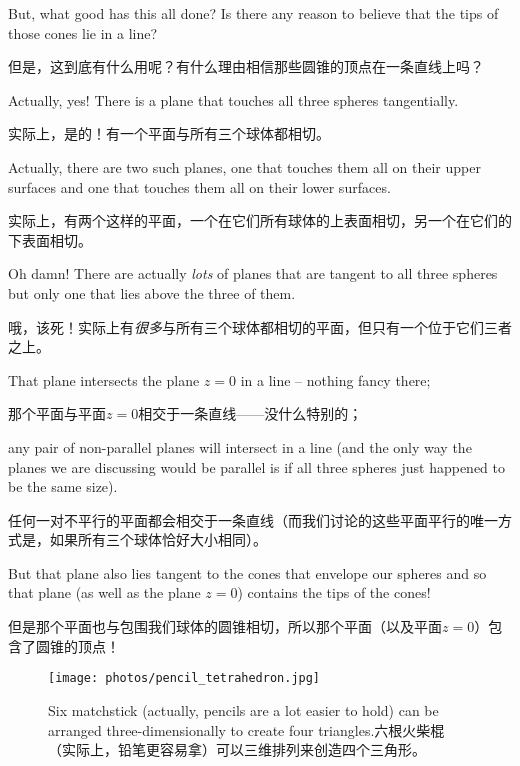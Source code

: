 But, what good has this all done?
Is there any reason to believe that the tips of those cones lie in a line?

但是，这到底有什么用呢？有什么理由相信那些圆锥的顶点在一条直线上吗？

Actually, yes!  There is a plane that touches all three spheres tangentially.

实际上，是的！有一个平面与所有三个球体都相切。

Actually, there are two such planes, one that touches them all on their
upper surfaces and one that touches them all on their lower surfaces.

实际上，有两个这样的平面，一个在它们所有球体的上表面相切，另一个在它们的下表面相切。

Oh 
damn!  There are actually \emph{lots} of planes that are tangent to all three spheres
but only one that lies above the three of them.

哦，该死！实际上有\emph{很多}与所有三个球体都相切的平面，但只有一个位于它们三者之上。

That plane intersects the
plane $z=0$ in a line -- nothing fancy there;

那个平面与平面$z=0$相交于一条直线——没什么特别的；

any pair of non-parallel planes
will intersect in a line (and the only way the planes we are discussing
would be parallel is if all three spheres just happened to be the same size).

任何一对不平行的平面都会相交于一条直线（而我们讨论的这些平面平行的唯一方式是，如果所有三个球体恰好大小相同）。

But that plane also lies tangent to the cones that envelope our spheres
and so that plane (as well as the plane $z=0$) contains the tips of the
cones!

但是那个平面也与包围我们球体的圆锥相切，所以那个平面（以及平面$z=0$）包含了圆锥的顶点！

\clearpage

\rule{0pt}{0pt}

\vfill

\begin{figure}[!hbtp] 
\begin{center}
\texttt{[image: photos/pencil\_tetrahedron.jpg]}
\end{center}
\caption[Four triangles bounded by 6 line segments. 由6条线段围成的四个三角形]{Six matchstick (actually, pencils are a lot easier to hold) can be arranged three-dimensionally to create
four triangles.六根火柴棍（实际上，铅笔更容易拿）可以三维排列来创造四个三角形。}
\label{fig:4triangles}
\end{figure}
 
\vfill

\rule{0pt}{0pt}

\clearpage





